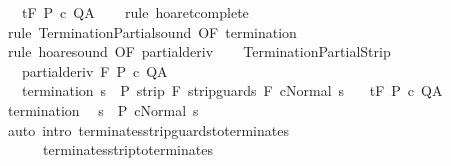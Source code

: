 \begin{isabellebody}
\ \ \ {\isachardoublequoteopen}{\isasymGamma}{\isacharcomma}{\isasymTheta}{\isasymturnstile}\isactrlsub t\isactrlbsub {\isacharslash}F\isactrlesub \ P\ c\ Q{\isacharcomma}A{\isachardoublequoteclose}\isanewline
%
\isadelimproof
\ \ %
\endisadelimproof
%
\isatagproof
{}\isamarkupfalse%
\ {\isacharparenleft}rule\ hoaret{\isacharunderscore}complete{\isacharprime}{\isacharparenright}\isanewline
\ \ \isamarkupfalse%
\ {\isacharparenleft}rule\ TerminationPartial{\isacharunderscore}sound\ {\isacharbrackleft}OF\ {\isachardoublequoteopen}termination{\isachardoublequoteclose}{\isacharbrackright}{\isacharparenright}\isanewline
\ \ \isamarkupfalse%
\ {\isacharparenleft}rule\ hoare{\isacharunderscore}sound\ {\isacharbrackleft}OF\ partial{\isacharunderscore}deriv{\isacharbrackright}{\isacharparenright}\isanewline
\ \ \isamarkupfalse%
%
\endisatagproof
{\isafoldproof}%
%
\isadelimproof
\isanewline
%
\endisadelimproof
\isanewline
{}\isamarkupfalse%
\ TerminationPartialStrip{\isacharcolon}\isanewline
\ \ \ partial{\isacharunderscore}deriv{\isacharcolon}\ {\isachardoublequoteopen}{\isasymGamma}{\isacharcomma}{\isasymTheta}{\isasymturnstile}\isactrlbsub {\isacharslash}F\isactrlesub \ P\ c\ Q{\isacharcomma}A{\isachardoublequoteclose}\isanewline
\ \ \ {\isachardoublequoteopen}termination{\isachardoublequoteclose}{\isacharcolon}\ {\isachardoublequoteopen}{\isasymforall}s\ {\isasymin}\ P{\isachardot}\ strip\ F{\isacharprime}\ {\isasymGamma}{\isasymturnstile}strip{\isacharunderscore}guards\ F{\isacharprime}\ c{\isasymdown}Normal\ s{\isachardoublequoteclose}\isanewline
\ \ \ {\isachardoublequoteopen}{\isasymGamma}{\isacharcomma}{\isasymTheta}{\isasymturnstile}\isactrlsub t\isactrlbsub {\isacharslash}F\isactrlesub \ P\ c\ Q{\isacharcomma}A{\isachardoublequoteclose}\isanewline
%
\isadelimproof
%
\endisadelimproof
%
\isatagproof
{}\isamarkupfalse%
\ {\isacharminus}\isanewline
\ \ \isamarkupfalse%
\ {\isachardoublequoteopen}termination{\isachardoublequoteclose}\ \isamarkupfalse%
\ {\isachardoublequoteopen}{\isasymforall}s\ {\isasymin}\ P{\isachardot}\ {\isasymGamma}{\isasymturnstile}c{\isasymdown}Normal\ s{\isachardoublequoteclose}\isanewline
\ \ \ \ \isamarkupfalse%
\ {\isacharparenleft}auto\ intro{\isacharcolon}\ terminates{\isacharunderscore}strip{\isacharunderscore}guards{\isacharunderscore}to{\isacharunderscore}terminates\ \isanewline
\ \ \ \ \ \ terminates{\isacharunderscore}strip{\isacharunderscore}to{\isacharunderscore}terminates{\isacharparenright}\isanewline

\end{isabellebody}
